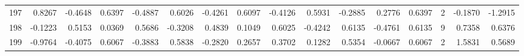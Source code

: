 \begin{tabular}{lrrrrrrrrrrrrrrr}
197 &      0.8267 & -0.4648 &  0.6397 & -0.4887 &  0.6026 & -0.4261 &  0.6097 & -0.4126 &  0.5931 & -0.2885 &   0.2776 &     0.6397 &      2 &                   -0.1870 &                    -1.2915 \\
198 &     -0.1223 &  0.5153 &  0.0369 &  0.5686 & -0.3208 &  0.4839 &  0.1049 &  0.6025 & -0.4242 &  0.6135 &  -0.4761 &     0.6135 &      9 &                    0.7358 &                     0.6376 \\
199 &     -0.9764 & -0.4075 &  0.6067 & -0.3883 &  0.5838 & -0.2820 &  0.2657 &  0.3702 &  0.1282 &  0.5354 &  -0.0667 &     0.6067 &      2 &                    1.5831 &                     0.5689 \\
\bottomrule
\end{tabular}
